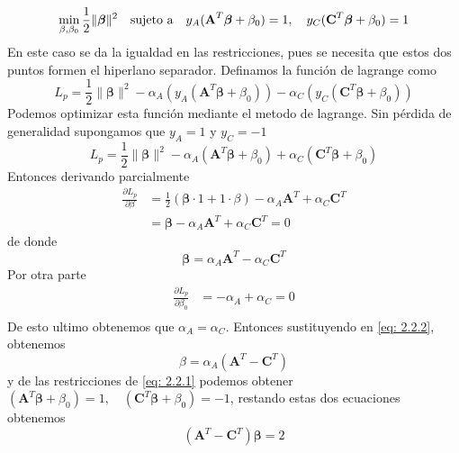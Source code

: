 \documentclass[letterpaper,12pt,oneside]{book}
\begin{document}
{{{        \begin{equation}
            \min_{\beta, \beta_0} \frac{1}{2} \|\boldsymbol{\beta}\|^2 \quad \text{sujeto a} \quad y_A (\textbf{A}^T \boldsymbol{\beta}+ \beta_0) = 1, \\
            \quad y_C (\textbf{C}^T \boldsymbol{\beta} + \beta_0) = 1  \label{eq: 2.2.1}
        \end{equation}
En este caso se da la igualdad en las restricciones, pues se necesita que estos dos puntos formen el hiperlano separador. 
Definamos la función de lagrange como 
    \begin{equation*}
        L_p=\frac{1}{2} \|\boldsymbol{\beta}\|^2 - \alpha_A(y_A (\textbf{A}^T \boldsymbol{\beta}+ \beta_0))- \alpha_C(y_C (\textbf{C}^T \boldsymbol{\beta}+ \beta_0))
    \end{equation*}
Podemos optimizar esta función mediante el metodo de lagrange. Sin pérdida de generalidad supongamos que $y_{A}=1$ y $y_{C}=-1$
    \begin{equation*}
        L_p=\frac{1}{2} \|\boldsymbol{\beta}\|^2 - \alpha_A(\textbf{A}^T \boldsymbol{\beta} + \beta_0)+\alpha_C (\textbf{C}^T \boldsymbol{\beta} + \beta_0)
    \end{equation*}
Entonces derivando parcialmente 
    \begin{align*}
        \frac{\partial L_p}{\partial \beta} &= \frac{1}{2} (\boldsymbol{\beta}\cdot 1 + 1\cdot\beta) - \alpha_A \textbf{A}^T  +\alpha_C \textbf{C}^T\\
        &=\boldsymbol{\beta} - \alpha_A \textbf{A}^T  +\alpha_C \textbf{C}^T =0
    \end{align*}
de donde 
    \begin{equation}
        \boldsymbol{\beta} =\alpha_A \textbf{A}^T - \alpha_C \textbf{C}^T \label{eq: 2.2.2}
    \end{equation}
Por otra parte 
    \begin{align*}
        \frac{\partial L_p}{\partial \beta_0} &= - \alpha_A  + \alpha_C=0\\
    \end{align*}
De esto ultimo obtenemos que  $\alpha_A  = \alpha_C$. Entonces sustituyendo en \eqref{eq: 2.2.2}, obtenemos 
    \begin{equation}
        \beta =\alpha_A(\textbf{A}^T - \textbf{C}^T) \label{eq: 2.2.3}
    \end{equation}
y de las restricciones de \eqref{eq: 2.2.1} podemos obtener $(\textbf{A}^T \boldsymbol{\beta} + \beta_0) = 1,  \quad (\textbf{C}^T\boldsymbol{\beta} + \beta_0) = -1$, restando estas dos ecuaciones obtenemos 
    \begin{equation}
        (\textbf{A}^T - \textbf{C}^T) \boldsymbol{\beta} =2 \label{eq: 2.2.4}
    \end{equation}
    
}}}
\end{document}
